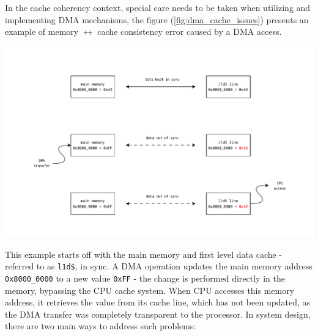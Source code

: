 \noindent In the cache coherency context, special care needs to be %
taken when utilizing and implementing DMA mechanisms, the figure
(\ref{fig:dma_cache_issues}) presents an example of memory $\leftrightarrow$
cache consistency error caused by a DMA access.

\begin{center}
	\centering
	\includegraphics[width=\textwidth]{figures/02-background/dma_cache_issues.pdf}
	\label{fig:dma_cache_issues}
\end{center}

\noindent This example starts off with the main memory and first level data cache - referred to as \texttt{l1d\$}, in sync.
A DMA operation updates the main memory address \texttt{0x8000\_0000} to a new value \texttt{0xFF} - the change is performed directly
in the memory, bypassing the CPU cache system. When CPU accesses this memory address, it retrieves the value from its
cache line, which has not been updated, as the DMA transfer was completely transparent to the processor.
In system design, there are two main ways to address such problems:

